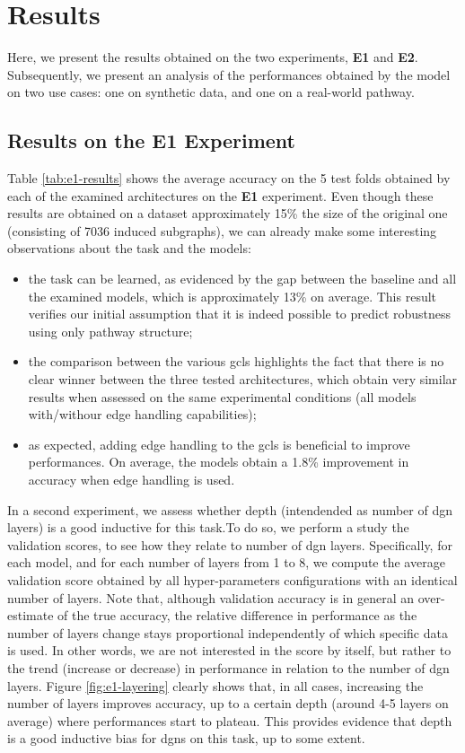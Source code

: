 \section{Results}
Here, we present the results obtained on the two experiments, \textbf{E1} and \textbf{E2}. Subsequently, we present an analysis of the performances obtained by the model on two use cases: one on synthetic data, and one on a real-world pathway.

\subsection{Results on the E1 Experiment}
Table \ref{tab:e1-results} shows the average accuracy on the 5 test folds obtained by each of the examined architectures on the \textbf{E1} experiment. Even though these results are obtained on a dataset approximately 15\% the size of the original one (consisting of 7036 induced subgraphs), we can already make some interesting observations about the task and the models:
\begin{itemize}
    \item the task can be learned, as evidenced by the gap between the baseline and all the examined models, which is approximately 13\% on average. This result verifies our initial assumption that it is indeed possible to predict robustness using only pathway structure;
    \item the comparison between the various \glspl{gcl} highlights the fact that there is no clear winner between the three tested architectures, which obtain very similar results when assessed on the same experimental conditions (\ie all models with/withour edge handling capabilities);
    \item as expected, adding edge handling to the \glspl{gcl} is beneficial to improve performances. On average, the models obtain a 1.8\% improvement in accuracy when edge handling is used.
\end{itemize}



In a second experiment, we assess whether depth (intendended as number of \gls{dgn} layers) is a good inductive for this task.To do so, we perform a \posthoc study the validation scores, to see how they relate to number of \gls{dgn} layers. Specifically, for each model, and for each number of layers from 1 to 8, we compute the average validation score obtained by all hyper-parameters configurations with an identical number of layers. Note that, although validation accuracy is in general an over-estimate of the true accuracy, the relative difference in performance as the number of layers change stays proportional independently of which specific data is used. In other words, we are not interested in the score by itself, but rather to the trend (increase or decrease) in performance in relation to the number of \gls{dgn} layers. Figure \ref{fig:e1-layering} clearly shows that, in all cases, increasing the number of layers improves accuracy, up to a certain depth (around 4-5 layers on average) where performances start to plateau. This provides evidence that depth is a good inductive bias for \glspl{dgn} on this task, up to some extent.

